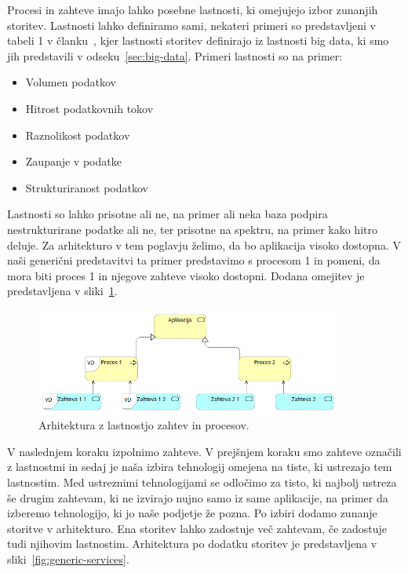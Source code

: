Procesi in zahteve imajo lahko posebne lastnosti,
ki omejujejo izbor zunanjih storitev.
Lastnosti lahko definiramo sami, nekateri primeri so predstavljeni v tabeli 1 v članku~\cite{iterative_methodology},
kjer lastnosti storitev definirajo iz lastnosti big data,
ki smo jih predstavili v odseku~\ref{sec:big-data}.
Primeri lastnosti so na primer:
\begin{itemize}
    \item Volumen podatkov
    \item Hitrost podatkovnih tokov
    \item Raznolikost podatkov
    \item Zaupanje v podatke
    \item Strukturiranost podatkov
\end{itemize}

Lastnosti so lahko prisotne ali ne, na primer ali neka baza podpira nestrukturirane podatke ali ne,
ter prisotne na spektru, na primer kako hitro deluje.
Za arhitekturo v tem poglavju želimo, da bo aplikacija visoko dostopna.
V naši generični predstavitvi ta primer predstavimo s procesom 1 in pomeni,
da mora biti proces 1 in njegove zahteve visoko dostopni.
Dodana omejitev je predstavljena v sliki~\ref{fig:generic-arch-application-labels}.

\begin{figure}[H]
    \centering
    \includegraphics[width=0.9\textwidth]{img/gradnja/generic-arch-application-labels.png}
    \caption{Arhitektura z lastnostjo zahtev in procesov.}
    \label{fig:generic-arch-application-labels}
\end{figure}

V naslednjem koraku izpolnimo zahteve.
V prejšnjem koraku smo zahteve označili z lastnostmi in sedaj je naša
izbira tehnologij omejena na tiste, ki ustrezajo tem lastnostim.
Med ustreznimi tehnologijami se odločimo za tisto,
ki najbolj ustreza še drugim zahtevam, ki ne izvirajo nujno samo iz
same aplikacije, na primer da izberemo tehnologijo, ki jo naše podjetje
že pozna.
Po izbiri dodamo zunanje storitve v arhitekturo.
Ena storitev lahko zadostuje več zahtevam,
če zadostuje tudi njihovim lastnostim.
Arhitektura po dodatku storitev je predstavljena v sliki~\ref{fig:generic-services}.

